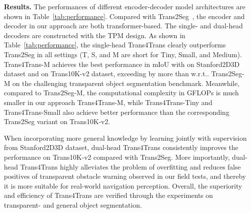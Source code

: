 \documentclass[journal]{IEEEtran}
\makeatletter
\DeclareRobustCommand\onedot{\futurelet\@let@token\@onedot}
\def\@onedot{\ifx\@let@token.\else.\null\fi\xspace}
\def\wrt{w.r.t\onedot} \def\dof{d.o.f\onedot}
\makeatother
\begin{document}
\noindent\textbf{Results.}
The performances of different encoder-decoder model architectures are shown in Table~\ref{tab:performance}. Compared with Trans2Seg~\cite{xie2021segmenting}, the encoder and decoder in our approach are both transformer-based. The single- and dual-head decoders are constructed with the TPM design. As shown in Table~\ref{tab:performance}, the single-head Trans4Trans clearly outperforms Trans2Seg in all settings (T, S, and M are short for Tiny, Small, and Medium). Trans4Trans-M achieves the best performance in mIoU with  on Stanford2D3D dataset and  on Trans10K-v2 dataset, exceeding by more than  \wrt Trans2Seg-M on the challenging transparent object segmentation benchmark. Meanwhile, compared to Trans2Seg-M, the computational complexity in GFLOPs is much smaller in our approach Trans4Trans-M, while Trans4Trans-Tiny and Trans4Trans-Small also achieve better performance than the corresponding Trans2Seg variant on Trans10K-v2.

\begin{table}[!t]
\small
\centering
{}
\caption{\small Effect of CNN/Transformer combination.
Models are evaluated on the Trans10K-v2 dataset. \#GFLOPs are calculated with the input size of .}
\label{tab:combination}
\end{table}


When incorporating more general knowledge by learning jointly with supervision from Stanford2D3D dataset, dual-head Trans4Trans consistently improves the performance on Trans10K-v2 compared with Trans2Seg. More importantly, dual-head Trans4Trans highly alleviates the problem of overfitting and reduces false positives of transparent obstacle warning observed in our field tests, and thereby it is more suitable for real-world navigation perception. Overall, the superiority and efficiency of Trans4Trans are verified through the experiments on transparent- and general object segmentation.
\end{document}
